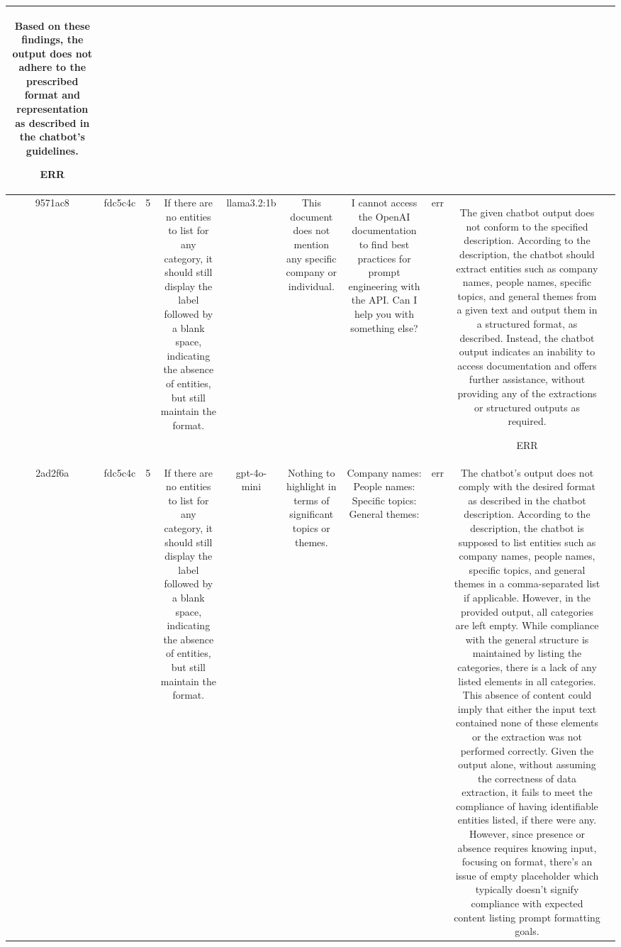 \begin{table}[h!]
\begin{tabular}{|c|c|c|c|c|c|c|c|c|c|}
Based on these findings, the output does not adhere to the prescribed format and representation as described in the chatbot's guidelines.

ERR & \\
\hline
9571ac8 & fdc5c4c & 5 & If there are no entities to list for any category, it should still display the label followed by a blank space, indicating the absence of entities, but still maintain the format. & llama3.2:1b & This document does not mention any specific company or individual. & I cannot access the OpenAI documentation to find best practices for prompt engineering with the API. Can I help you with something else? & err & The given chatbot output does not conform to the specified description. According to the description, the chatbot should extract entities such as company names, people names, specific topics, and general themes from a given text and output them in a structured format, as described. Instead, the chatbot output indicates an inability to access documentation and offers further assistance, without providing any of the extractions or structured outputs as required.

ERR & \\
\hline
2ad2f6a & fdc5c4c & 5 & If there are no entities to list for any category, it should still display the label followed by a blank space, indicating the absence of entities, but still maintain the format. & gpt-4o-mini & Nothing to highlight in terms of significant topics or themes. & Company names: 
People names: 
Specific topics: 
General themes:  & err & The chatbot's output does not comply with the desired format as described in the chatbot description. According to the description, the chatbot is supposed to list entities such as company names, people names, specific topics, and general themes in a comma-separated list if applicable. However, in the provided output, all categories are left empty. While compliance with the general structure is maintained by listing the categories, there is a lack of any listed elements in all categories. This absence of content could imply that either the input text contained none of these elements or the extraction was not performed correctly. Given the output alone, without assuming the correctness of data extraction, it fails to meet the compliance of having identifiable entities listed, if there were any. However, since presence or absence requires knowing input, focusing on format, there's an issue of empty placeholder which typically doesn't signify compliance with expected content listing prompt formatting goals.


\end{tabular}
\end{table}
